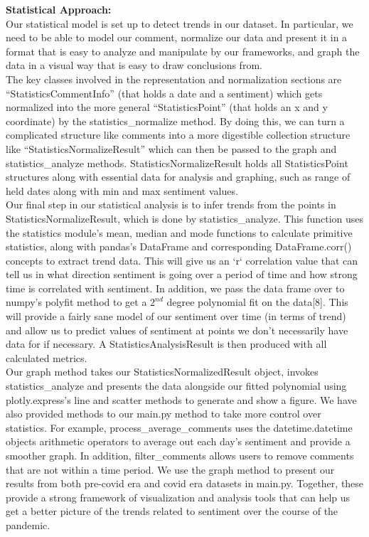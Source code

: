 \documentclass[fontsize=11pt]{article}
\begin{document}
\textbf{Statistical Approach:}\\
Our statistical model is set up to detect trends in our dataset. In particular, we need to be able to model our comment, normalize our data and present it in a format that is easy to analyze and manipulate by our frameworks, and graph the data in a visual way that is easy to draw conclusions from.\\
The key classes involved in the representation and normalization sections are “StatisticsCommentInfo” (that holds a date and a sentiment) which gets normalized into the more general “StatisticsPoint” (that holds an x and y coordinate) by the statistics\_normalize method. By doing this, we can turn a complicated structure like comments into a more digestible collection structure like “StatisticsNormalizeResult” which can then be passed to the graph and statistics\_analyze methods. StatisticsNormalizeResult holds all StatisticsPoint structures along with essential data for analysis and graphing, such as range of held dates along with min and max sentiment values.\\
Our final step in our statistical analysis is to infer trends from the points in StatisticsNormalizeResult, which is done by statistics\_analyze. This function uses the statistics module’s mean, median and mode functions to calculate primitive statistics, along with pandas’s DataFrame and corresponding DataFrame.corr() concepts to extract trend data. This will give us an `r` correlation value that can tell us in what direction sentiment is going over a period of time and how strong time is correlated with sentiment. In addition, we pass the data frame over to numpy’s polyfit method to get a $2^{nd}$ degree polynomial fit on the data[8]. This will provide a fairly sane model of our sentiment over time (in terms of trend) and allow us to predict values of sentiment at points we don’t necessarily have data for if necessary. A StatisticsAnalysisResult is then produced with all calculated metrics.\\
Our graph method takes our StatisticsNormalizedResult object, invokes statistics\_analyze and presents the data alongside our fitted polynomial using plotly.express’s line and scatter methods to generate and show a figure. We have also provided methods to our main.py method to take more control over statistics. For example, process\_average\_comments uses the datetime.datetime objects arithmetic operators to average out each day’s sentiment and provide a smoother graph. In addition, filter\_comments allows users to remove comments that are not within a time period. We use the graph method to present our results from both pre-covid era and covid era datasets in main.py. Together, these provide a strong framework of visualization and analysis tools that can help us get a better picture of the trends related to sentiment over the course of the pandemic.\\\\
\end{document}
